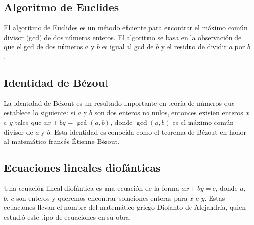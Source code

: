\subsection{Algoritmo de Euclides}
El algoritmo de Euclides es un método eficiente para encontrar el máximo común divisor (gcd) de dos números enteros. El algoritmo se basa en la observación de que el gcd de dos números $a$ y $b$ es igual al gcd de $b$ y el residuo de dividir $a$ por $b$. 

\subsection{Identidad de Bézout}
La identidad de Bézout es un resultado importante en teoría de números que establece lo siguiente: si $a$ y $b$ son dos enteros no nulos, entonces existen enteros $x$ e $y$ tales que $ax + by = \gcd(a, b)$, donde $\gcd(a, b)$ es el máximo común divisor de $a$ y $b$. Esta identidad es conocida como el teorema de Bézout en honor al matemático francés Étienne Bézout.

\subsection{Ecuaciones lineales diofánticas}
Una ecuación lineal diofántica es una ecuación de la forma $ax + by = c$, donde $a$, $b$, $c$ son enteros y queremos encontrar soluciones enteras para $x$ e $y$. Estas ecuaciones llevan el nombre del matemático griego Diofanto de Alejandría, quien estudió este tipo de ecuaciones en su obra.